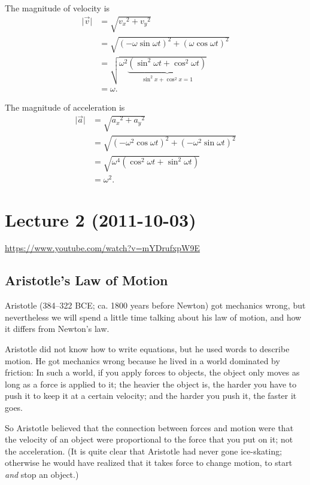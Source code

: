 \documentclass[pagesize,headsepline,10pt,parskip=half]{scrreprt}
\newcommand{\abs}[1]{\lvert#1\rvert}
\begin{document}
            The magnitude of velocity is
            \begin{align*}
              \abs{\vec v} &= \sqrt{{v_x}^2 + {v_y}^2} \\
              &= \sqrt{\left(-\omega
              \sin{\omega t}\right)^2 + \left(\omega \cos{\omega t}\right)^2} \\
              &= \sqrt{\omega^2 \underbrace{\left(\sin^2{\omega t} +
              \cos^2{\omega t}\right)}_{\sin^2{x} + \cos^2{x} = 1}} \\
              &= \omega.
            \end{align*}

            The magnitude of acceleration is
            \begin{align*}
              \abs{\vec a} &= \sqrt{{a_x}^2 + {a_y}^2} \\
              &= \sqrt{\left(- \omega^2 \cos{\omega t}\right)^2 + \left(-
              \omega^2 \sin{\omega t}\right)^2} \\
              &= \sqrt{\omega^4 \left(\cos^2{\omega t} +
              \sin^2{\omega t}\right)} \\
              &= \omega^2.
            \end{align*}

  \chapter{Lecture 2 (2011-10-03)}
    \url{https://www.youtube.com/watch?v=mYDrufxpW9E}

    \section{Aristotle's Law of Motion}
      Aristotle (384–322 BCE; ca. 1800 years before Newton) got mechanics
      wrong, but nevertheless we will spend a little time talking about his law
      of motion, and how it differs from Newton's law.

      Aristotle did not know how to write equations, but he used words
      to describe motion.  He got mechanics wrong because he lived in a
      world dominated by friction: In such a world, if you apply forces to
      objects, the object only moves as long as a force is applied to it;
      the heavier the object is, the harder you have to push it to keep it at a
      certain velocity; and the harder you push it, the faster it goes.

      So Aristotle believed that the connection between forces and motion were
      that the velocity of an object were proportional to the force that you
      put on it; not the acceleration. (It is quite clear that Aristotle had
      never gone ice-skating; otherwise he would have realized that it takes
      force to change motion, to start \emph{and} stop an object.)
\end{document}
